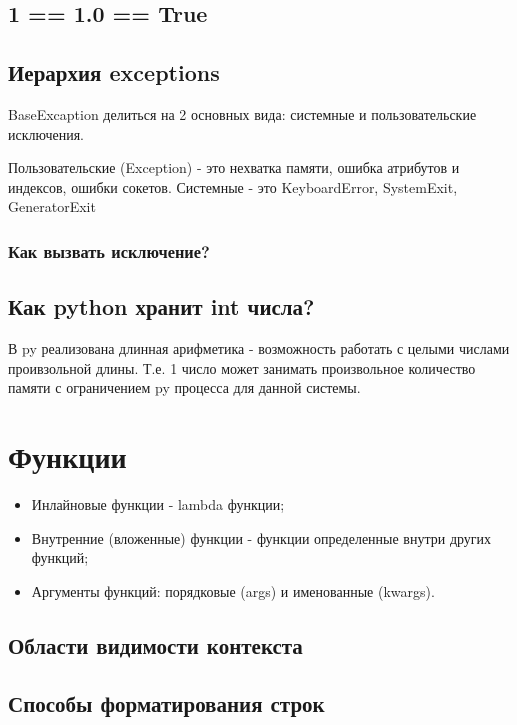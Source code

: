 \subsection{1 == 1.0 == True}

\subsection{Иерархия exceptions}

BaseExcaption делиться на 2 основных вида: системные и пользовательские исключения.

Пользовательские (Exception) - это нехватка памяти, ошибка атрибутов и индексов, ошибки сокетов.
Системные - это KeyboardError, SystemExit, GeneratorExit 

\subsubsection{Как вызвать исключение?}


\subsection{Как python хранит int числа?}

В py реализована длинная арифметика - возможность работать с целыми числами проивзольной длины. Т.е. 1 число может занимать произвольное количество памяти с ограничением py процесса для данной системы.

\section{Функции}

\begin{itemize}
    \item Инлайновые функции - lambda функции;
    \item Внутренние (вложенные) функции - функции определенные внутри других функций;
    \item Аргументы функций: порядковые (args) и именованные (kwargs).
\end{itemize}

\subsection{Области видимости контекста}

\subsection{Способы форматирования строк}

